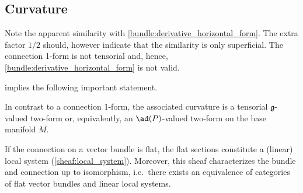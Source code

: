 \subsection{Curvature}


    \begin{remark}
        Note the apparent similarity with \cref{bundle:derivative_horizontal_form}. The extra factor $1/2$ should, however indicate that the similarity is only superficial. The connection 1-form is not tensorial and, hence, \cref{bundle:derivative_horizontal_form} is not valid.
    \end{remark}

     implies the following important statement.
    \begin{property}[Tensorial]
        In contrast to a connection 1-form, the associated curvature is a tensorial $\mathfrak{g}$-valued two-form or, equivalently, an $\ad(P)$-valued two-form on the base manifold $M$.
    \end{property}


    \begin{property}
        If the connection on a vector bundle is flat, the flat sections constitute a (linear) local system (\cref{sheaf:local_system}). Moreover, this sheaf characterizes the bundle and connection up to isomorphism, i.e.~there exists an equivalence of categories of flat vector bundles and linear local systems.
    \end{property}

